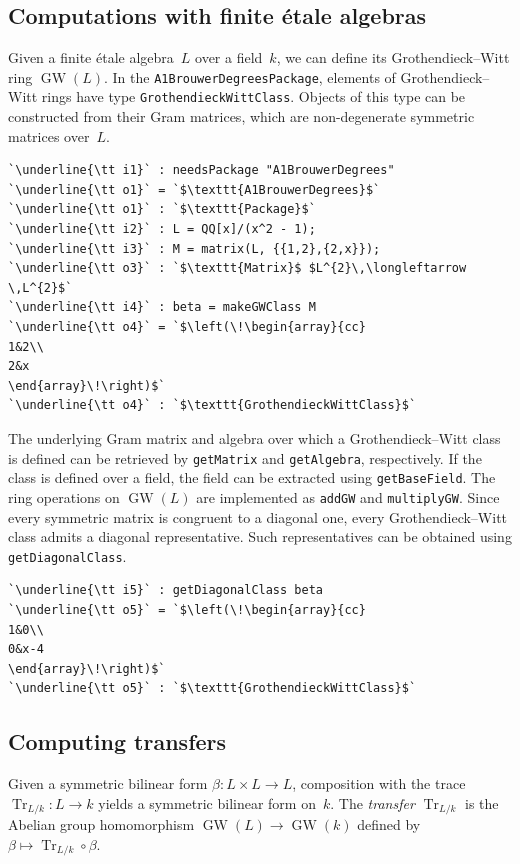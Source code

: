 \documentclass[12pt]{amsart}
\theoremstyle{definition}
\DeclareMathOperator{\GW}{GW}
\DeclareMathOperator{\Tr}{Tr}
\begin{document}
\subsection{Computations with finite \'{e}tale algebras}\label{subsec: fin et computations}
Given a finite \'{e}tale algebra~$L$ over a field~$k$, we can define its Grothendieck--Witt ring $\GW(L)$. In the \texttt{A1BrouwerDegreesPackage}, elements of Grothendieck--Witt rings have type \texttt{GrothendieckWittClass}. Objects of this type can be constructed from their Gram matrices, which are non-degenerate symmetric matrices over~$L$. 
\begin{lstlisting}[language=Macaulay2output]
`\underline{\tt i1}` : needsPackage "A1BrouwerDegrees"
`\underline{\tt o1}` = `$\texttt{A1BrouwerDegrees}$`
`\underline{\tt o1}` : `$\texttt{Package}$`
`\underline{\tt i2}` : L = QQ[x]/(x^2 - 1);
`\underline{\tt i3}` : M = matrix(L, {{1,2},{2,x}});
`\underline{\tt o3}` : `$\texttt{Matrix}$ $L^{2}\,\longleftarrow \,L^{2}$`
`\underline{\tt i4}` : beta = makeGWClass M
`\underline{\tt o4}` = `$\left(\!\begin{array}{cc}
1&2\\
2&x
\end{array}\!\right)$`
`\underline{\tt o4}` : `$\texttt{GrothendieckWittClass}$`
\end{lstlisting}
The underlying Gram matrix and algebra over which a Grothendieck--Witt class is defined can be retrieved by \texttt{getMatrix} and \texttt{getAlgebra}, respectively. If the class is defined over a field, the field can be extracted using \texttt{getBaseField}. The ring operations on $\GW(L)$ are implemented as \texttt{addGW} and \texttt{multiplyGW}. Since every symmetric matrix is congruent to a diagonal one, every Grothendieck--Witt class admits a diagonal representative. Such representatives can be obtained using \texttt{getDiagonalClass}. 
\begin{lstlisting}[language=Macaulay2output]
`\underline{\tt i5}` : getDiagonalClass beta
`\underline{\tt o5}` = `$\left(\!\begin{array}{cc}
1&0\\
0&x-4
\end{array}\!\right)$`
`\underline{\tt o5}` : `$\texttt{GrothendieckWittClass}$`
\end{lstlisting}

\subsection{Computing transfers}\label{subsec: transfers}
Given a symmetric bilinear form $\beta\colon L\times L\to L$, composition with the trace $\Tr_{L/k}\colon L\to k$ yields a symmetric bilinear form on~$k$. The \emph{transfer} $\Tr_{L/k}$ is the Abelian group homomorphism $\GW(L)\to\GW(k)$  defined by $\beta\mapsto\Tr_{L/k}\circ\beta$. 
\end{document}
